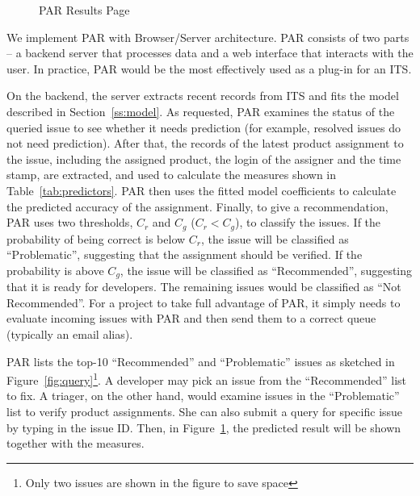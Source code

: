 \documentclass{sig-alternate}
\begin{document}
\begin{figure}[ht]
\vspace{-.3cm}
\centering
{}
\caption{PAR Results Page}\label{fig:result}
\vspace{-.35cm}
\end{figure}



We implement PAR with Browser/Server architecture. PAR consists of two parts
-- a backend server that processes data and a web interface
that interacts with the user. In practice, PAR would be the most
effectively used as a plug-in for an ITS.

On the backend, the server extracts recent records from ITS and fits
the model described in Section~\ref{ss:model}.  As requested, PAR
examines the status of the queried issue to see whether it needs
prediction (for example, resolved issues do not need
prediction). After that, the records of the latest product
assignment to the issue, including the assigned product, the login
of the assigner and the time stamp, are extracted, and used to
calculate the measures shown in Table~\ref{tab:predictors}.  PAR
then uses the fitted model coefficients to calculate the predicted
accuracy of the assignment.  Finally, to give a recommendation, PAR
uses two thresholds, $C_r$ and $C_g$ ($C_r < C_g$), to classify the
issues.  If the probability of being correct is below $C_r$, the issue will be
classified as ``Problematic'', suggesting that the assignment should be
verified. If the probability is above $C_g$, the issue will
be classified as ``Recommended'', suggesting that it is ready for
developers. The remaining issues would be classified as ``Not
Recommended''. For a project to take full advantage of PAR, it simply
needs to evaluate incoming issues with PAR and then send them to a
correct queue (typically an email alias).

PAR lists the top-10 ``Recommended'' and
``Problematic'' issues as sketched in Figure~\ref{fig:query}\footnote{Only two issues are shown in the figure to save space}.
A developer
may pick an issue from the ``Recommended'' list
to fix. A triager, on the other hand, would examine issues in the
``Problematic'' list to verify
product assignments. She can also submit a query for
specific issue by typing in the issue ID. Then, in Figure~\ref{fig:result},
the predicted result will be shown together with the measures.
\end{document}

